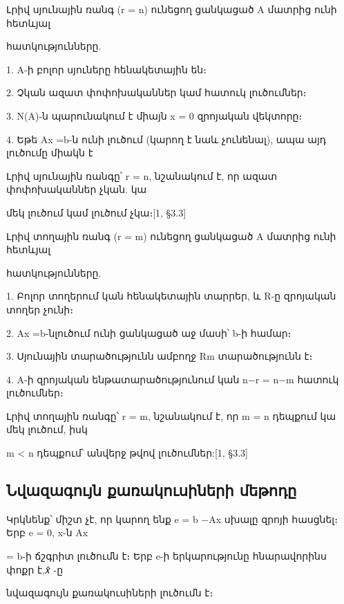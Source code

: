 \documentclass[11pt,a4paper]{article}
\begin{document}
Լրիվ սյունային ռանգ (r = n) ունեցող ցանկացած A մատրից ունի հետևյալ

հատկությունները.




1. A-ի բոլոր սյուները հենակետային են։




2. Չկան ազատ փոփոխականներ կամ հատուկ լուծումներ։




3. N(A)-ն պարունակում է միայն x = 0 զրոյական վեկտորը։




4. Եթե Ax =b-ն ունի լուծում (կարող է նաև չունենալ), ապա այդ լուծումը միակն է




Լրիվ սյունային ռանգը՝ r = n, նշանակում է, որ ազատ փոփոխականներ չկան. կա

մեկ լուծում կամ լուծում չկա։[1, §3.3]




Լրիվ տողային ռանգ (r = m) ունեցող ցանկացած A մատրից ունի հետևյալ

հատկությունները.




1. Բոլոր տողերում կան հենակետային տարրեր, և R-ը զրոյական տողեր չունի։




2. Ax =b-նլուծում ունի ցանկացած աջ մասի՝ b-ի համար։




3. Սյունային տարածությունն ամբողջ Rm տարածությունն է։




4. A-ի զրոյական ենթատարածությունում կան n−r = n−m հատուկ լուծումներ։




Լրիվ տողային ռանգը՝ r = m, նշանակում է, որ m = n դեպքում կա մեկ լուծում, իսկ

m < n դեպքում՝ անվերջ թվով լուծումներ:[1, §3.3]

\subsection{Նվազագույն քառակուսիների մեթոդը}

Կրկնենք՝ միշտ չէ, որ կարող ենք e = b −Ax սխալը զրոյի հասցնել։ Երբ e = 0, x-ն Ax

= b-ի ճշգրիտ լուծումն է։ Երբ e-ի երկարությունը հնարավորինս փոքր է,𝑥̂ -ը




նվազագույն քառակուսիների լուծումն է։
\end{document}
